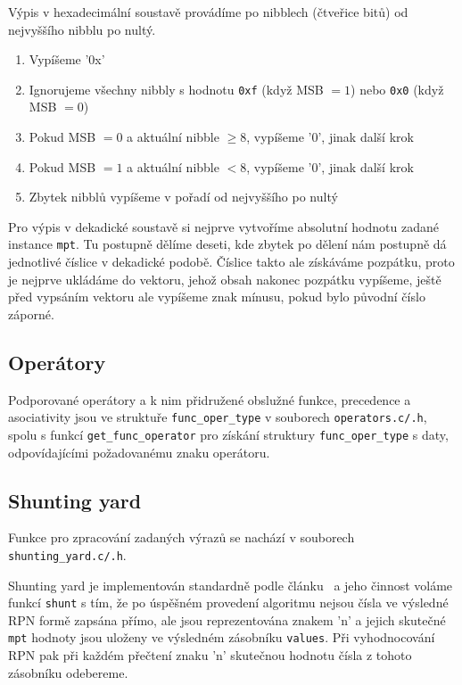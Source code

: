 Výpis v hexadecimální soustavě provádíme po nibblech (čtveřice bitů) od nejvyššího nibblu po nultý.
\begin{enumerate}
    \item Vypíšeme '0x'
    \item Ignorujeme všechny nibbly s hodnotu \verb|0xf| (když MSB $ = 1$) nebo \verb|0x0| (když MSB $ = 0$)
    \item Pokud MSB $ = 0$ a aktuální nibble $\geq 8$, vypíšeme '0', jinak další krok
    \item Pokud MSB $ = 1$ a aktuální nibble $<8$, vypíšeme '0', jinak další krok
    \item Zbytek nibblů vypíšeme v pořadí od nejvyššího po nultý
\end{enumerate}

Pro výpis v dekadické soustavě si nejprve vytvoříme absolutní hodnotu zadané instance \verb|mpt|. Tu postupně dělíme deseti, kde zbytek po dělení nám postupně dá jednotlivé číslice v dekadické podobě. Číslice takto ale získáváme pozpátku, proto je nejprve ukládáme do vektoru, jehož obsah nakonec pozpátku vypíšeme, ještě před vypsáním vektoru ale vypíšeme znak mínusu, pokud bylo původní číslo záporné.

\subsection{Operátory}
Podporované operátory a k nim přidružené obslužné funkce, precedence a asociativity jsou ve struktuře \verb|func_oper_type| v souborech \verb|operators.c/.h|, spolu s funkcí \verb|get_func_operator| pro získání struktury \verb|func_oper_type| s daty, odpovídajícími požadovanému znaku operátoru.
\newpage

\subsection{Shunting yard}
Funkce pro zpracování zadaných výrazů se nachází v souborech \verb|shunting_yard.c/.h|.

Shunting yard je implementován standardně podle článku~\cite{bib:shunting_yard} a jeho činnost voláme funkcí \verb|shunt| s tím, že po úspěšném provedení algoritmu nejsou čísla ve výsledné RPN formě zapsána přímo, ale jsou reprezentována znakem 'n' a jejich skutečné \verb|mpt| hodnoty jsou uloženy ve výsledném zásobníku \verb|values|. Při vyhodnocování RPN pak při každém přečtení znaku 'n' skutečnou hodnotu čísla z tohoto zásobníku odebereme. 

